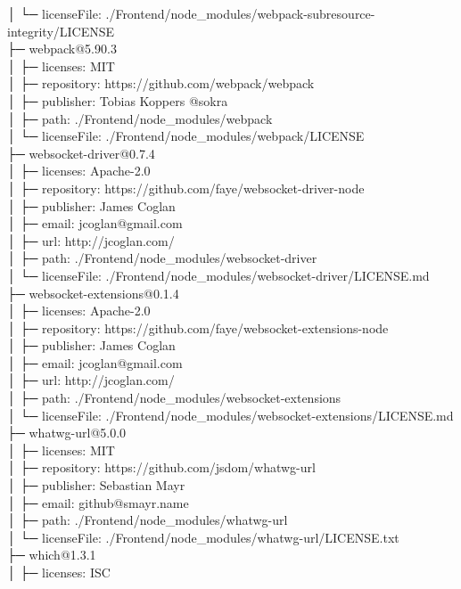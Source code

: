 │  └─ licenseFile: ./Frontend/node\_modules/webpack-subresource-integrity/LICENSE\\
├─ webpack@5.90.3\\
│  ├─ licenses: MIT\\
│  ├─ repository: https://github.com/webpack/webpack\\
│  ├─ publisher: Tobias Koppers @sokra\\
│  ├─ path: ./Frontend/node\_modules/webpack\\
│  └─ licenseFile: ./Frontend/node\_modules/webpack/LICENSE\\
├─ websocket-driver@0.7.4\\
│  ├─ licenses: Apache-2.0\\
│  ├─ repository: https://github.com/faye/websocket-driver-node\\
│  ├─ publisher: James Coglan\\
│  ├─ email: jcoglan@gmail.com\\
│  ├─ url: http://jcoglan.com/\\
│  ├─ path: ./Frontend/node\_modules/websocket-driver\\
│  └─ licenseFile: ./Frontend/node\_modules/websocket-driver/LICENSE.md\\
├─ websocket-extensions@0.1.4\\
│  ├─ licenses: Apache-2.0\\
│  ├─ repository: https://github.com/faye/websocket-extensions-node\\
│  ├─ publisher: James Coglan\\
│  ├─ email: jcoglan@gmail.com\\
│  ├─ url: http://jcoglan.com/\\
│  ├─ path: ./Frontend/node\_modules/websocket-extensions\\
│  └─ licenseFile: ./Frontend/node\_modules/websocket-extensions/LICENSE.md\\
├─ whatwg-url@5.0.0\\
│  ├─ licenses: MIT\\
│  ├─ repository: https://github.com/jsdom/whatwg-url\\
│  ├─ publisher: Sebastian Mayr\\
│  ├─ email: github@smayr.name\\
│  ├─ path: ./Frontend/node\_modules/whatwg-url\\
│  └─ licenseFile: ./Frontend/node\_modules/whatwg-url/LICENSE.txt\\
├─ which@1.3.1\\
│  ├─ licenses: ISC\\

